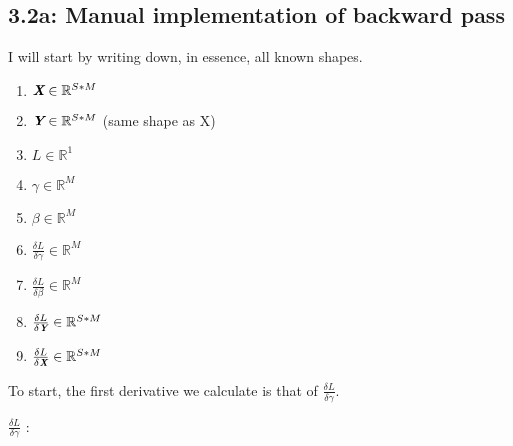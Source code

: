 \subsection*{3.2a: Manual implementation of backward pass}
I will start by writing down, in essence, all known shapes.

\begin{enumerate}
    \item $\emph{\textbf{X}} \in \mathbb{R}^{S * M}$
    \item $\emph{\textbf{Y}} \in \mathbb{R}^{S * M}$ (same shape as X)
    \item $L \in \mathbb{R}^{1}$
    \item $\gamma \in \mathbb{R}^{M}$
    \item $\beta \in \mathbb{R}^{M}$
    \item $\frac{\delta L}{\delta \gamma} \in \mathbb{R}^{M}$
    \item $\frac{\delta L}{\delta \beta} \in \mathbb{R}^{M}$
    \item $\frac{\delta L}{\delta \emph{\textbf{Y}}} \in \mathbb{R}^{S * M}$
    \item $\frac{\delta L}{\delta \emph{\textbf{X}}} \in \mathbb{R}^{S * M}$
\end{enumerate}

To start, the first derivative we calculate is that of $\frac{\delta L}{\delta \gamma}$.

{\Large $\frac{\delta L}{\delta \gamma}$ }:

